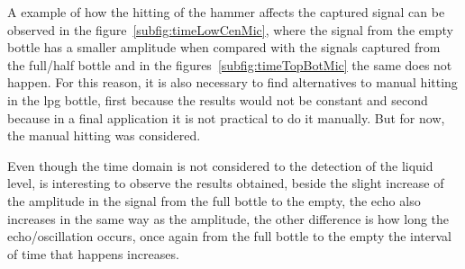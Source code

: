 A example of how the hitting of the hammer affects the captured signal can be observed in the figure~\ref{subfig:timeLowCenMic}, where the signal from the empty bottle has a smaller amplitude when compared with the signals captured from the full/half bottle and in the figures~\ref{subfig:timeTopBotMic} the same does not happen. For this reason, it is also necessary to find alternatives to manual hitting in the \acrshort{lpg} bottle, first because the results would not be constant and second because in a final application it is not practical to do it manually. But for now, the manual hitting was considered.

Even though the time domain is not considered to the detection of the liquid level, is interesting to observe the results obtained, beside the slight increase of the amplitude in the signal from the full bottle to the empty, the echo also increases in the same way as the amplitude, the other difference is how long the echo/oscillation occurs, once again from the full bottle to the empty the interval of time that happens increases.

